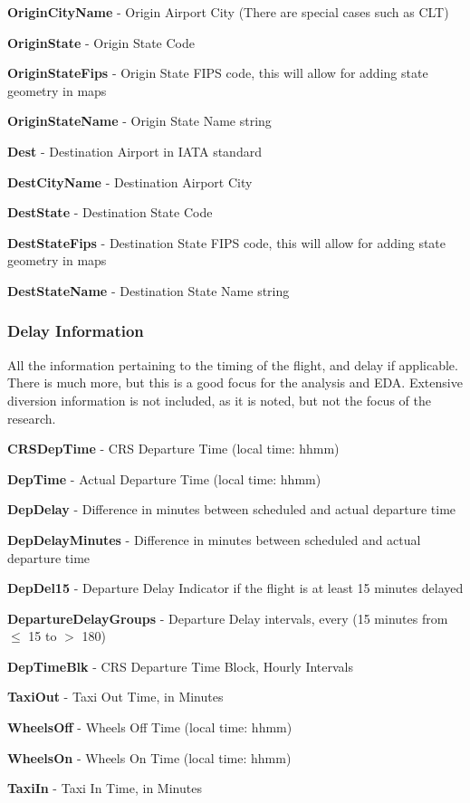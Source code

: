 \documentclass[a4paper,12pt]{article}
\begin{document}
\textbf{OriginCityName} - Origin Airport City (There are special cases such as CLT)

\textbf{OriginState} - Origin State Code

\textbf{OriginStateFips} - Origin State FIPS code, this will allow for adding state geometry in maps

\textbf{OriginStateName} - Origin State Name string

\textbf{Dest} - Destination Airport in IATA standard

\textbf{DestCityName} - Destination Airport City

\textbf{DestState} - Destination State Code

\textbf{DestStateFips} - Destination State FIPS code, this will allow for adding state geometry in maps

\textbf{DestStateName} - Destination State Name string

\subsubsection{Delay Information}
All the information pertaining to the timing of the flight, and delay if applicable. There is much more, but this is a good focus for the analysis and EDA.
Extensive diversion information is not included, as it is noted, but not the focus of the research.

\textbf{CRSDepTime} - CRS Departure Time (local time: hhmm)

\textbf{DepTime} - Actual Departure Time (local time: hhmm)

\textbf{DepDelay} - Difference in minutes between scheduled and actual departure time

\textbf{DepDelayMinutes} - Difference in minutes between scheduled and actual departure time

\textbf{DepDel15} - Departure Delay Indicator if the flight is at least 15 minutes delayed

\textbf{DepartureDelayGroups} - Departure Delay intervals, every (15 minutes from $\leq$ 15 to $>$ 180)

\textbf{DepTimeBlk} - CRS Departure Time Block, Hourly Intervals

\textbf{TaxiOut} - Taxi Out Time, in Minutes

\textbf{WheelsOff} - Wheels Off Time (local time: hhmm)

\textbf{WheelsOn} - Wheels On Time (local time: hhmm)

\textbf{TaxiIn} - Taxi In Time, in Minutes
\end{document}
